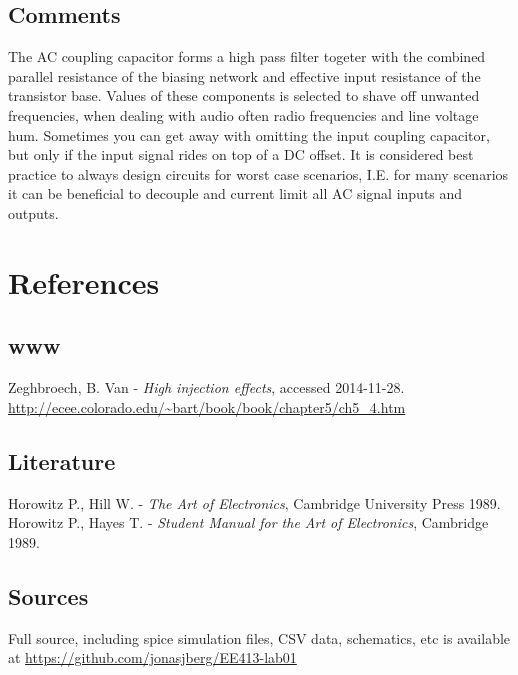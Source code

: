 \documentclass[11pt,a4paper]{article}
\begin{document}
\subsection{Comments}\label{comments}
The AC coupling capacitor forms a high pass filter togeter with the combined
parallel resistance of the biasing network and effective input resistance of
the transistor base. Values of these components is selected to shave off unwanted
frequencies, when dealing with audio often radio frequencies and line voltage hum.
Sometimes you can get away with omitting the input coupling capacitor, but only
if the input signal rides on top of a DC offset. It is considered best practice
to always design circuits for worst case scenarios, I.E. for many scenarios it 
can be beneficial to decouple and current limit all AC signal inputs and outputs.

\pagebreak
\section{References}\label{references}

\subsection{www}\label{www}
Zeghbroech, B. Van - \textit{High injection effects}, accessed 2014-11-28. \\
\url{http://ecee.colorado.edu/~bart/book/book/chapter5/ch5_4.htm}

\subsection{Literature}\label{literature}

Horowitz P., Hill W. -  \textit{The Art of Electronics}, Cambridge University Press 1989.\\
\medskip 
Horowitz P., Hayes T. - \textit{Student Manual for the Art of Electronics}, Cambridge 1989.

\subsection{Sources}\label{sources}
Full source, including spice simulation files, CSV data, schematics, etc
is available at \url{https://github.com/jonasjberg/EE413-lab01}


\end{document}
